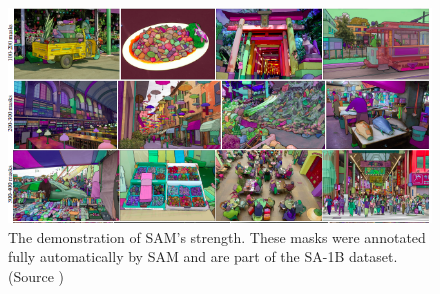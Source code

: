 \begin{figure}[h]
  \centering
  \includegraphics[width=\linewidth]{text/chapter_03/imgs/sam_example}
  \caption{The demonstration of SAM's strength. These masks were annotated fully automatically by SAM and are part of
  the SA-1B dataset. (Source \cite{SAM2023})}
  \label{fig:sam_example}
\end{figure}

